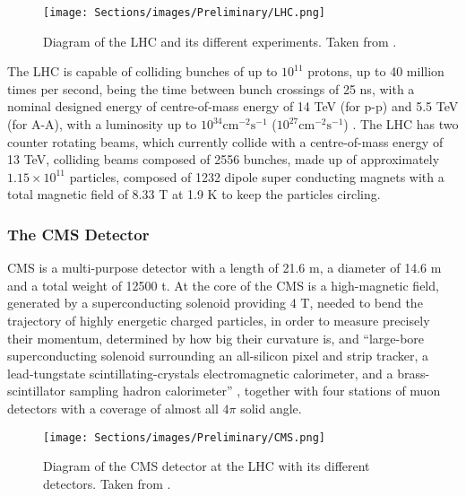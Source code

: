 \begin{figure}[ht!]
    \centering
    \texttt{[image: Sections/images/Preliminary/LHC.png]}
    \caption{Diagram of the LHC and its different experiments. Taken from \cite{LHC}.}
    \label{LHC}
\end{figure}

The LHC is capable of colliding bunches of up to $10^{11}$ protons, up to 40 million times per second, being the time between bunch crossings of 25 ns, with a nominal designed energy of centre-of-mass energy of 14 TeV (for p-p) and 5.5 TeV (for A-A), with a luminosity up to $10^{34}\textrm{cm}^{-2}\textrm{s}^{-1}$ ($10^{27}\textrm{cm}^{-2}\textrm{s}^{-1}$) \cite{CMS}\cite{ATLAS}. The LHC has two counter rotating beams, which currently collide with a centre-of-mass energy of 13 TeV, colliding beams composed of 2556 bunches, made up of approximately $1.15\times10^{11}$ particles, composed of 1232 dipole super conducting magnets with a total magnetic field of 8.33 T at 1.9 K to keep the particles circling.

\subsubsection{The CMS Detector} \label{ssec:CMS}

CMS is a multi-purpose detector with a length of 21.6 m, a diameter of 14.6 m and a total weight of 12500 t. At the core of the CMS is a high-magnetic field, generated by a superconducting solenoid providing 4 T, needed to bend the trajectory of highly energetic charged particles, in order to measure precisely their momentum, determined by how big their curvature is, and ``large-bore superconducting solenoid surrounding an all-silicon pixel and strip tracker, a lead-tungstate scintillating-crystals electromagnetic calorimeter, and a brass-scintillator sampling hadron calorimeter'' \cite{CMS}, together with four stations of muon detectors with a coverage of almost all $4\pi$ solid angle.

\begin{figure}[ht!]
    \centering
    \texttt{[image: Sections/images/Preliminary/CMS.png]}
    \caption{Diagram of the CMS detector at the LHC with its different detectors. Taken from \cite{imagenCMS}.}
    \label{CMS}
\end{figure}

\vspace{0.6cm}

